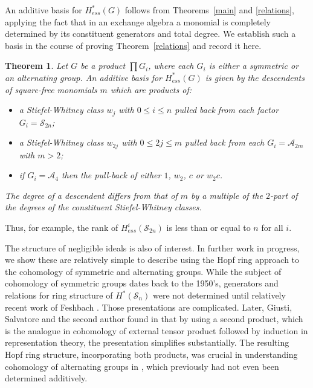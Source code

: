 \documentclass{article}
\theoremstyle{plain}
\newtheorem{theorem}{Theorem}
\theoremstyle{definition}
\newcommand{\si}{\mathcal{S}}
\newcommand{\alt}{\mathcal{A}}
\begin{document}


An additive basis for $H^*_{ess}(G )$ follows from Theorems~\ref{main} and \ref{relations}, 
applying the fact that in an exchange algebra a monomial is completely determined by its constituent generators and total degree.  
We establish such a basis in the course of proving Theorem~\ref{relations} and record it here.

\begin{theorem}\label{basis}
Let $G$ be a product $\prod G_i$, where each $G_i$ is either
a symmetric or an alternating group. An additive basis for $H^*_{ess}(G)$ is given by the descendents of square-free
monomials $m$ which are products of:
\begin{itemize}
    \item a Stiefel-Whitney class $w_j$ with $0 \leq i \leq n$ pulled back from each factor $G_i = \si_{2n}$;
    \item a Stiefel-Whitney class $w_{2j}$ with $0 \leq 2j \leq m$ pulled back from each $G_i = \alt_{2m}$ with $m>2$;
    \item if $G_i = \alt_4$ then  the pull-back of either $1$, $w_2$, $c$ or $w_2 c$.

    \end{itemize}
The degree of a descendent differs from that of $m$ 
by  a multiple of the $2$-part 
of the degrees
of the constituent Stiefel-Whitney classes.
\end{theorem}
 
Thus, for example, 
the rank of $H^i_{ess}(\si_{2n})$ is less than
or equal to $n$ for all $i$.


 The structure of negligible ideals is also of interest.  In
 further work in progress, we show these are relatively simple to describe using
 the Hopf ring approach to the 
 cohomology of symmetric and alternating groups. While the subject of
cohomology of symmetric groups dates back to the 1950's,
generators and relations
for ring structure of $H^*(\si_n )$ were not
determined until relatively recent work of Feshbach  \cite{Fesh02}. Those presentations are complicated.
Later, Giusti, Salvatore and the second author found in \cite{GSS12} that by using
a second product, which is the analogue in cohomology 
of  external tensor product followed
by induction in representation theory, the presentation simplifies
substantially.  The resulting Hopf ring structure, incorporating 
both products, was crucial
in understanding cohomology of alternating groups in \cite{GiSi21}, which
previously had not even been determined additively.  
\end{document}
